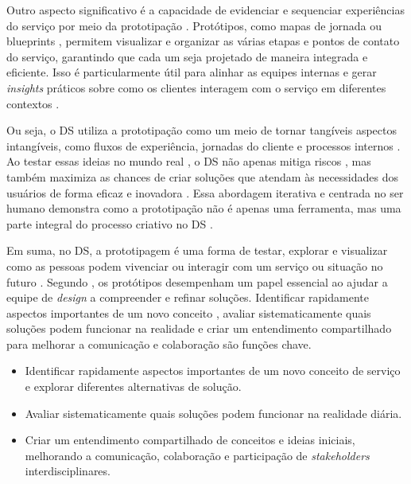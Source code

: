 Outro aspecto significativo é a capacidade de evidenciar e sequenciar experiências do serviço por meio da prototipação \cite{iriarte2023service}. Protótipos, como mapas de jornada ou blueprints \cite{Rosenbaum2017How, milton2021eatingdisorders}, permitem visualizar e organizar as várias etapas e pontos de contato do serviço, garantindo que cada um seja projetado de maneira integrada e eficiente. Isso é particularmente útil para alinhar as equipes internas e gerar \textit{insights} práticos sobre como os clientes interagem com o serviço em diferentes contextos \cite{paust2025integrative}.

Ou seja, o DS utiliza a prototipação como um meio de tornar tangíveis aspectos intangíveis, como fluxos de experiência, jornadas do cliente e processos internos \cite{soto2023prototyping, Blomkvist2014}. Ao testar essas ideias no mundo real \cite{Stickdorn2019}, o DS não apenas mitiga riscos \cite{mager2023product}, mas também maximiza as chances de criar soluções que atendam às necessidades dos usuários de forma eficaz e inovadora \cite{paust2025integrative}. Essa abordagem iterativa e centrada no ser humano demonstra como a prototipação não é apenas uma ferramenta, mas uma parte integral do processo criativo no DS \cite{kumar2023rheumatology}.

Em suma, no DS, a prototipagem é uma forma de testar, explorar e visualizar como as pessoas podem vivenciar ou interagir com um serviço ou situação no futuro \cite{soto2023prototyping, BuchenauSuri2000Experience}. Segundo , os protótipos desempenham um papel essencial ao ajudar a equipe de \textit{design} a compreender e refinar soluções. Identificar rapidamente aspectos importantes de um novo conceito \cite{paust2025integrative}, avaliar sistematicamente quais soluções podem funcionar na realidade \cite{paust2025integrative} e criar um entendimento compartilhado para melhorar a comunicação e colaboração \cite{paust2025integrative, mager2023product} são funções chave.

\begin{itemize}
	\item Identificar rapidamente aspectos importantes de um novo conceito de serviço e explorar diferentes alternativas de solução.
	\item Avaliar sistematicamente quais soluções podem funcionar na realidade diária.
	\item Criar um entendimento compartilhado de conceitos e ideias iniciais, melhorando a comunicação, colaboração e participação de \textit{stakeholders} interdisciplinares.
\end{itemize}

